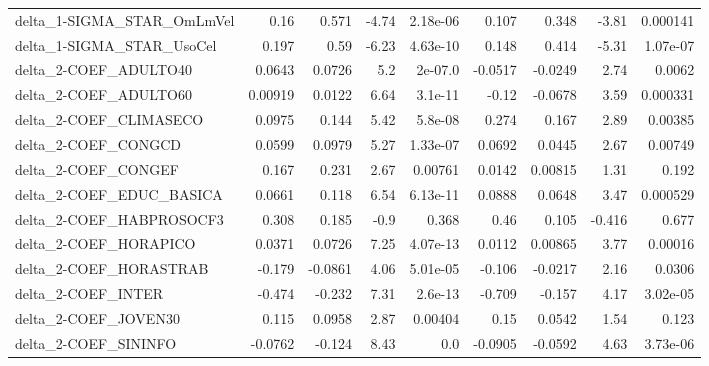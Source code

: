 \begin{tabular}{lrrrrrrrr}
delta\_1-SIGMA\_STAR\_OmLmVel            &        0.16 &        0.571 &   -4.74 & 2.18e-06 &      0.107 &       0.348 &        -3.81 &      0.000141 \\
delta\_1-SIGMA\_STAR\_UsoCel             &       0.197 &         0.59 &   -6.23 & 4.63e-10 &      0.148 &       0.414 &        -5.31 &      1.07e-07 \\
delta\_2-COEF\_ADULTO40                 &      0.0643 &       0.0726 &     5.2 &  2e-07.0 &    -0.0517 &     -0.0249 &         2.74 &        0.0062 \\
delta\_2-COEF\_ADULTO60                 &     0.00919 &       0.0122 &    6.64 &  3.1e-11 &      -0.12 &     -0.0678 &         3.59 &      0.000331 \\
delta\_2-COEF\_CLIMASECO                &      0.0975 &        0.144 &    5.42 &  5.8e-08 &      0.274 &       0.167 &         2.89 &       0.00385 \\
delta\_2-COEF\_CONGCD                   &      0.0599 &       0.0979 &    5.27 & 1.33e-07 &     0.0692 &      0.0445 &         2.67 &       0.00749 \\
delta\_2-COEF\_CONGEF                   &       0.167 &        0.231 &    2.67 &  0.00761 &     0.0142 &     0.00815 &         1.31 &         0.192 \\
delta\_2-COEF\_EDUC\_BASICA              &      0.0661 &        0.118 &    6.54 & 6.13e-11 &     0.0888 &      0.0648 &         3.47 &      0.000529 \\
delta\_2-COEF\_HABPROSOCF3              &       0.308 &        0.185 &    -0.9 &    0.368 &       0.46 &       0.105 &       -0.416 &         0.677 \\
delta\_2-COEF\_HORAPICO                 &      0.0371 &       0.0726 &    7.25 & 4.07e-13 &     0.0112 &     0.00865 &         3.77 &       0.00016 \\
delta\_2-COEF\_HORASTRAB                &      -0.179 &      -0.0861 &    4.06 & 5.01e-05 &     -0.106 &     -0.0217 &         2.16 &        0.0306 \\
delta\_2-COEF\_INTER                    &      -0.474 &       -0.232 &    7.31 &  2.6e-13 &     -0.709 &      -0.157 &         4.17 &      3.02e-05 \\
delta\_2-COEF\_JOVEN30                  &       0.115 &       0.0958 &    2.87 &  0.00404 &       0.15 &      0.0542 &         1.54 &         0.123 \\
delta\_2-COEF\_SININFO                  &     -0.0762 &       -0.124 &    8.43 &      0.0 &    -0.0905 &     -0.0592 &         4.63 &      3.73e-06 \\

\end{tabular}
